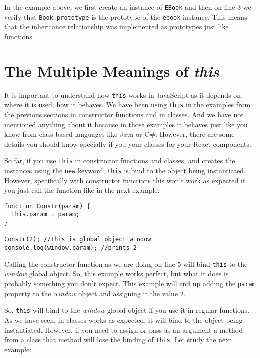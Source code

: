 \documentclass[a4paper, oneside, titlepage, 12pt]{book}
\begin{document}
In the example above, we first create an instance of \texttt{EBook} and then on line 3 we verify that \texttt{Book.prototype} is the prototype of the \texttt{ebook} instance. This means that the inheritance relationship was implemented as prototypes just like functions.

\section{The Multiple Meanings of \textit{this}} \label{meaning_of_this}

It is important to understand how \texttt{this} works in JavaScript as it depends on where it is used, how it behaves. We have been using \texttt{this} in the examples from the previous sections in constructor functions and in classes. And we have not mentioned anything about it because in those examples it behaves just like you know from class-based languages like Java or C\#. However, there are some details you should know specially if you your classes for your React components.

So far, if you use \texttt{this} in constructor functions and classes, and creates the instances using the \texttt{new} keyword, \texttt{this} is bind to the object being instantiated. However, specifically with constructor functions this won't work as expected if you just call the function like in the next example: 

\begin{verbatim}
function Constr(param) {
  this.param = param;
}

Constr(2); //this is global object window
console.log(window.param); //prints 2
\end{verbatim}

Calling the constructor function as we are doing on line 5 will bind \texttt{this} to the \textit{window} global object. So, this example works perfect, but what it does is probably something you don't expect. This example will end up adding the \texttt{param} property to the \textit{window} object and assigning it the value \texttt{2}.

So, \texttt{this} will bind to the \textit{window} global object if you use it in regular functions. As we have seen, in classes works as expected, it will bind to the object being instantiated. However, if you need to assign or pass as an argument a method from a class that method will lose the binding of \texttt{this}. Let study the next example:
\end{document}
